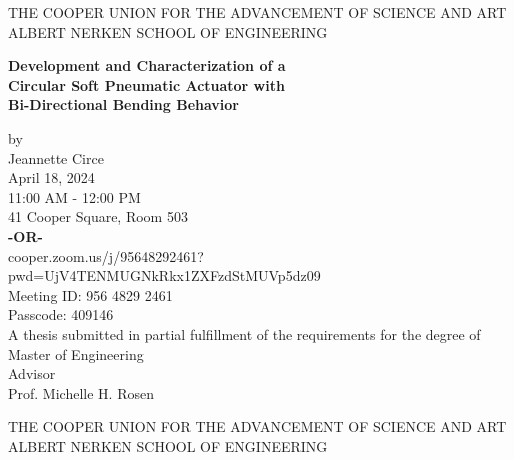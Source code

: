 \documentclass[12pt]{report}
\begin{document}
\begin{center}
\thispagestyle{empty}
\uppercase{THE COOPER UNION FOR THE ADVANCEMENT OF SCIENCE AND ART}\\[-0.9ex]
\uppercase{ALBERT NERKEN SCHOOL OF ENGINEERING}\\[-0.9ex]

\vspace{2cm}
\begin{center}
\textbf{\LARGE{Development and Characterization of a}} \\ 
\textbf{\LARGE{Circular Soft Pneumatic Actuator with}} \\ 
\textbf{\LARGE{Bi-Directional Bending Behavior}}
\medskip\par
\normalsize{by} \\
\Large{Jeannette Circe}\\
\vspace{0.7 cm}
\normalsize{April 18, 2024}\\
\vspace{-0.3 cm}
\normalsize{11:00 AM - 12:00 PM}\\
\vspace{-0.3 cm}
\normalsize{41 Cooper Square, Room 503}\\
\vspace{-0.3 cm}
\textbf{\footnotesize{-OR-}} \\
\normalsize{cooper.zoom.us/j/95648292461?pwd=UjV4TENMUGNkRkx1ZXFzdStMUVp5dz09}\\
\vspace{-0.3 cm}
\normalsize{Meeting ID: 956 4829 2461}\\
\vspace{-0.3 cm}
\normalsize{Passcode: 409146}\\
\vspace{1 cm}
\normalsize{A thesis submitted in partial fulfillment of the requirements for the degree of \\ Master of Engineering } \\
\vspace{1 cm}
\normalsize{Advisor}\\
\normalsize{Prof. Michelle H. Rosen}\\
\end{center}
\medskip
\end{center}
\clearpage


\begin{center}
\thispagestyle{empty}
\uppercase{THE COOPER UNION FOR THE ADVANCEMENT OF SCIENCE AND ART}\\[-0.9ex]
\uppercase{ALBERT NERKEN SCHOOL OF ENGINEERING}\\[-0.9ex]
\vspace{5cm}
\end{center}
\end{document}
